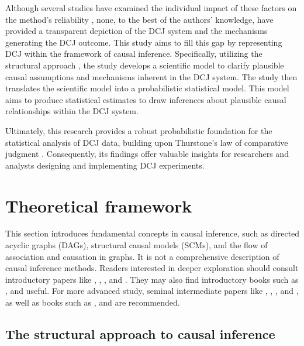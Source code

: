 \documentclass[
  authoryear,
  preprint,
  1p]{elsarticle}
\begin{document}
Although several studies have examined the individual impact of these
factors on the method's reliability
\citep{Bramley_2015, Pollitt_2012b, Bramley_et_al_2019, Verhavert_et_al_2019, Crompvoets_et_al_2022, vanDaal_et_al_2017, Gijsen_et_al_2021},
none, to the best of the authors' knowledge, have provided a transparent
depiction of the DCJ system and the mechanisms generating the DCJ
outcome. This study aims to fill this gap by representing DCJ within the
framework of causal inference. Specifically, utilizing the structural
approach \citep{Wright_1921, Pearl_2009, Pearl_et_al_2016}, the study
develops a scientific model to clarify plausible causal assumptions and
mechanisms inherent in the DCJ system. The study then translates the
scientific model into a probabilistic statistical model. This model aims
to produce statistical estimates to draw inferences about plausible
causal relationships within the DCJ system.

Ultimately, this research provides a robust probabilistic foundation for
the statistical analysis of DCJ data, building upon Thurstone's law of
comparative judgment \citeyearpar{Thurstone_1927}. Consequently, its
findings offer valuable insights for researchers and analysts designing
and implementing DCJ experiments.

\section{Theoretical framework}\label{sec-framework}

This section introduces fundamental concepts in causal inference, such
as directed acyclic graphs (DAGs), structural causal models (SCMs), and
the flow of association and causation in graphs. It is not a
comprehensive description of causal inference methods. Readers
interested in deeper exploration should consult introductory papers like
\citet{Pearl_2010}, \citet{Rohrer_2018}, \citet{Pearl_2019}, and
\citet{Cinelli_et_al_2020}. They may also find introductory books such
as \citet{Pearl_et_al_2018}, \citet{Neal_2020} and
\citet{McElreath_2020} useful. For more advanced study, seminal
intermediate papers like \citet{Neyman_et_al_1923}, \citet{Rubin_1974},
\citet{Spirtes_et_al_1991}, and \citet{Sekhon_2009}, as well as books
such as \citet{Pearl_2009}, \citet{Morgan_et_al_2014} and
\citet{Hernan_et_al_2020} are recommended.

\subsection{The structural approach to causal
inference}\label{sec-framework-structural}
\end{document}
